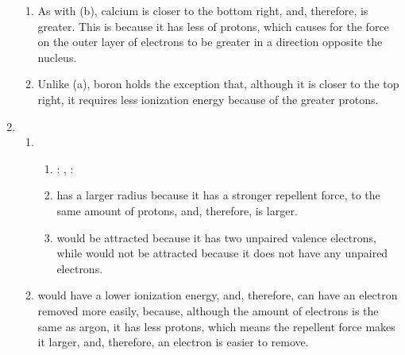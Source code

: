 \documentclass[12pt]{article}
\begin{document}
\begin{enumerate}
\begin{enumerate}
      \item As with (b), calcium is closer to the bottom right, and, therefore, is greater. This is because it has less of protons, which causes for the force on the outer layer of electrons to be greater in a direction opposite the nucleus.

      \item Unlike (a), boron holds the exception that, although it is closer to the top right, it requires less ionization energy because of the greater protons.

    \end{enumerate}

    \setcounter{enumi}{5}

  \item 

    \begin{enumerate}

      \item 

        \begin{enumerate}

          \item {}: , : 

          \item {} has a larger radius because it has a stronger repellent force, to the same amount of protons, and, therefore, is larger.

          \item {} would be attracted because it has two unpaired valence electrons, while  would not be attracted because it does not have any unpaired electrons.

        \end{enumerate}

      \item {} would have a lower ionization energy, and, therefore, can have an electron removed more easily, because, although the amount of electrons is the same as argon, it has less protons, which means the repellent force makes it larger, and, therefore, an electron is easier to remove. 

    \end{enumerate}

\end{enumerate}
\end{document}
